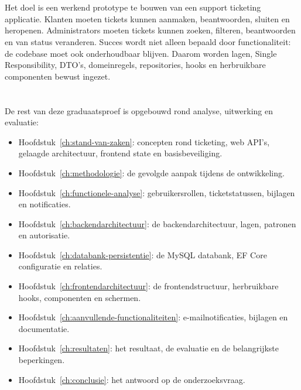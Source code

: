 \section{}%
\label{sec:onderzoeksdoelstelling}


Het doel is een werkend prototype te bouwen van een support ticketing applicatie. Klanten moeten tickets kunnen aanmaken, beantwoorden, sluiten en heropenen. Administrators moeten tickets kunnen zoeken, filteren, beantwoorden en van status veranderen. Succes wordt niet alleen bepaald door functionaliteit: de codebase moet ook onderhoudbaar blijven. Daarom worden lagen, Single Responsibility, DTO's, domeinregels, repositories, hooks en herbruikbare componenten bewust ingezet.

\section{}%
\label{sec:opzet-graduaatsproef}


De rest van deze graduaatsproef is opgebouwd rond analyse, uitwerking en evaluatie:

\begin{itemize}[nosep, leftmargin=*]
  \item Hoofdstuk~\ref{ch:stand-van-zaken}: concepten rond ticketing, web API's, gelaagde architectuur, frontend state en basisbeveiliging.
  \item Hoofdstuk~\ref{ch:methodologie}: de gevolgde aanpak tijdens de ontwikkeling.
  \item Hoofdstuk~\ref{ch:functionele-analyse}: gebruikersrollen, ticketstatussen, bijlagen en notificaties.
  \item Hoofdstuk~\ref{ch:backendarchitectuur}: de backendarchitectuur, lagen, patronen en autorisatie.
  \item Hoofdstuk~\ref{ch:databank-persistentie}: de MySQL databank, EF Core configuratie en relaties.
  \item Hoofdstuk~\ref{ch:frontendarchitectuur}: de frontendstructuur, herbruikbare hooks, componenten en schermen.
  \item Hoofdstuk~\ref{ch:aanvullende-functionaliteiten}: e-mailnotificaties, bijlagen en documentatie.
  \item Hoofdstuk~\ref{ch:resultaten}: het resultaat, de evaluatie en de belangrijkste beperkingen.
  \item Hoofdstuk~\ref{ch:conclusie}: het antwoord op de onderzoeksvraag.
\end{itemize}
